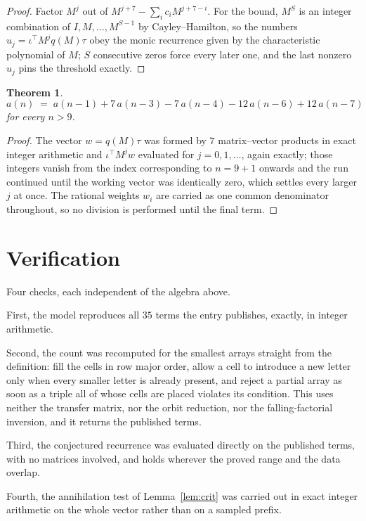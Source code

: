 \documentclass[11pt,a4paper]{article}
\theoremstyle{plain}
\newtheorem{theorem}{Theorem}
\theoremstyle{definition}
\begin{document}
\begin{proof}
Factor $M^{j}$ out of $M^{j+7}-\sum_ic_iM^{j+7-i}$. For the bound, $M^{S}$
is an integer combination of $I,M,\dots,M^{S-1}$ by Cayley--Hamilton, so the numbers
$u_j=\iota^{\!\top}M^{j}q(M)\tau$ obey the monic recurrence given by the characteristic
polynomial of $M$; $S$ consecutive zeros force every later one, and the last nonzero $u_j$
pins the threshold exactly.
\end{proof}

\begin{theorem}
\[
a(n)\;=\;a(n-1) + 7\,a(n-3) - 7\,a(n-4) - 12\,a(n-6) + 12\,a(n-7)
\]
for every $n>9$.
\end{theorem}

\begin{proof}
The vector $w=q(M)\tau$ was formed by $7$ matrix--vector products in exact integer
arithmetic and $\iota^{\!\top}M^{j}w$ evaluated for $j=0,1,\dots$, again exactly; those
integers vanish from the index corresponding to $n=9+1$ onwards and the run continued
until the working vector was identically zero, which settles every larger $j$ at once. The
rational weights $w_i$ are carried as one common denominator throughout, so no division is
performed until the final term.
\end{proof}

\section{Verification}

Four checks, each independent of the algebra above.

First, the model reproduces all $35$ terms the entry publishes, exactly, in integer
arithmetic.

Second, the count was recomputed for the smallest arrays straight from the definition: fill the
cells in row major order, allow a cell to introduce a new letter only when every smaller letter
is already present, and reject a partial array as soon as a triple all of whose cells are
placed violates its condition. This uses neither the transfer matrix, nor the orbit reduction,
nor the falling-factorial inversion, and it returns the published terms.

Third, the conjectured recurrence was evaluated directly on the published terms, with no
matrices involved, and holds wherever the proved range and the data overlap.

Fourth, the annihilation test of Lemma~\ref{lem:crit} was carried out in exact integer
arithmetic on the whole vector rather than on a sampled prefix.
\end{document}
